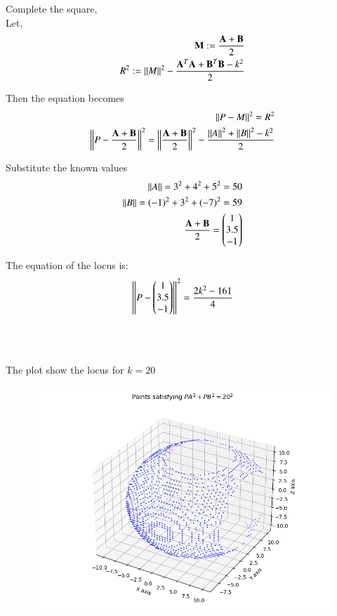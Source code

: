 \documentclass[journal]{IEEEtran}
\begin{document}
Complete the square,\\ 
Let, \\ 
\begin{align}
    \mathbf{M}:=\frac{\mathbf{A}+\mathbf{B}}{2} \\ 
    R^2:=\left\lVert M\right\rVert^2-\frac{\mathbf{A}^T\mathbf{A}+\mathbf{B}^T\mathbf{B}-k^2}{2}\\ 
\end{align}

Then the equation becomes\\ 
\begin{align}
    \left\lVert P-M\right\rVert^2=R^2 \\ 
    \left\lVert P-\frac{\mathbf{A}+\mathbf{B}}{2}\right\rVert^2=\left\lVert\frac{\mathbf{A}+\mathbf{B}}{2}\right\rVert^2-\frac{\left\lVert A\right\rVert^2+\left\lVert B\right\rVert^2-k^2}{2}
\end{align}

Substitute the known values
\begin{align}
    \left\lVert A\right\rVert=3^2+4^2+5^2=50 \\
    \left\lVert B\right\rVert=(-1)^2+3^2+(-7)^2=59 \\
    \frac{\mathbf{A}+\mathbf{B}}{2}=\begin{pmatrix}1 \\ 3.5 \\ -1\end{pmatrix}
\end{align}

The equation of the locus is:
\begin{align}
    \left\lVert P-\begin{pmatrix}1 \\ 3.5 \\ -1\end{pmatrix}\right\rVert^2=\frac{2k^2-161}{4}
\end{align}
\\ \\ \\ 
The plot show the locus for $k=20$

\begin{figure}[H]
    \centering
    \includegraphics[width=1\columnwidth]{figs/plot2_1.png}
    \caption{}
    \label{fig:plot}
\end{figure}
\end{document}
